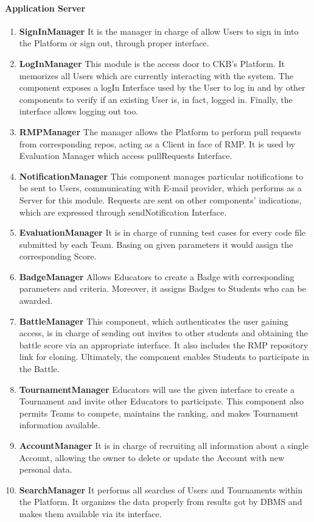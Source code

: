 \paragraph{Application Server}
\begin{enumerate}
    \item \textbf{SignInManager} It is the manager in charge of allow Users to sign in into the Platform or sign out, through proper interface.
    \item \textbf{LogInManager} This module is the access door to CKB's Platform. It memorizes all Users which are currently interacting with the system. The component exposes a logIn Interface used by the User to log in 
    and by other components to verify if an existing User is, in fact, logged in. Finally, the interface allows logging out too.
    \item \textbf{RMPManager} The manager allows the Platform to perform pull requests from corresponding repos, acting as a Client in face of RMP. It is used by Evaluation Manager which access pullRequests Interface.
    \item \textbf{NotificationManager} This component manages particular notifications to be sent to Users, communicating with E-mail provider, which performs as a Server for this module. Requests are sent on other 
    components' indications, which are expressed through sendNotification Interface.
    \item \textbf{EvaluationManager} It is in charge of running test cases for every code file submitted by each Team. Basing on given parameters it would assign the corresponding Score.
    \item \textbf{BadgeManager} Allows Educators to create a Badge with corresponding parameters and criteria. Moreover, it assigns Badges to Students who can be awarded.
    \item \textbf{BattleManager} This component, which authenticates the user gaining access, is in charge of sending out invites to other students and obtaining the battle score via an appropriate interface. It also 
    includes the RMP repository link for cloning. Ultimately, the component enables Students to participate in the Battle.
    \item \textbf{TournamentManager} Educators will use the given interface to create a Tournament and invite other Educators to participate. This component also permits Teams to compete, maintains the ranking, and makes
    Tournament information available.
    \item \textbf{AccountManager} It is in charge of recruiting all information about a single Account, allowing the owner to delete or update the Account with new personal data.
    \item \textbf{SearchManager} It performs all searches of Users and Tournaments within the Platform. It organizes the data properly from results got by DBMS and makes them available via its interface.
\end{enumerate}


